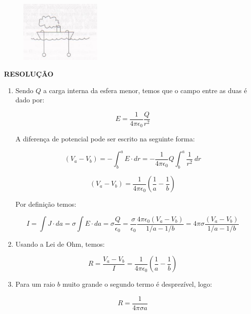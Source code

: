 \documentclass[11pt,a4paper]{article}
\begin{document}
\begin{enumerate}
\begin{enumerate}
\begin{figure}[h]	
\centering %
\includegraphics[width=4cm]{Selection_093.jpg} 
\end{figure}
\end{enumerate}


\textbf{RESOLUÇÃO}

\begin{enumerate}

\item 

Sendo $Q$ a carga interna da esfera menor, temos que o campo entre as duas é dado por:

$$E = \displaystyle\dfrac{1}{4\pi \epsilon_0} \displaystyle\dfrac{Q}{r^2}$$

A diferença de potencial pode ser escrito na seguinte forma:

$$(V_a - V_b) = -\displaystyle\int_b^{a} E \cdot dr = -\displaystyle\dfrac{1}{4\pi \epsilon_0} Q \displaystyle\int_b^{a} \displaystyle\dfrac{1}{r^2} \ dr$$

$$(V_a - V_b) = \displaystyle\dfrac{1}{4\pi \epsilon_0}\left(\displaystyle\dfrac{1}{a} - \displaystyle\dfrac{1}{b}\right)$$

Por definição temos:

$$I = \displaystyle\int J \cdot da = \sigma\displaystyle\int E \cdot da = \sigma \displaystyle\dfrac{Q}{\epsilon_0} = \displaystyle\dfrac{\sigma}{\epsilon_0} \displaystyle\dfrac{4\pi \epsilon_0 (V_a - V_b)}{1/a - 1/b} = 4\pi\sigma \displaystyle\dfrac{(V_a - V_b)}{1/a - 1/b}$$

\item

Usando a Lei de Ohm, temos:

$$R = \displaystyle\dfrac{V_a - V_b}{I} = \displaystyle\dfrac{1}{4\pi \epsilon_0} \left(\displaystyle\dfrac{1}{a} - \displaystyle\dfrac{1}{b}\right)$$ 

\item

Para um raio $b$ muito grande o segundo termo é desprezível, logo:

$$R = \displaystyle\dfrac{1}{4\pi \sigma a}$$


\end{enumerate}
\end{enumerate}
\end{document}
